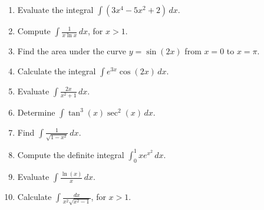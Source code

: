 \documentclass{article}
\begin{document}
    \begin{enumerate}
    \item Evaluate the integral \(\displaystyle \int (3x^4 - 5x^2 + 2) \, dx\).
    \item Compute \(\displaystyle \int \frac{1}{x \ln x} \, dx\), for \(x > 1\).
    \item Find the area under the curve \(y = \sin(2x)\) from \(x=0\) to \(x=\pi\).
    \item Calculate the integral \(\displaystyle \int e^{3x} \cos(2x) \, dx\).
    \item Evaluate \(\displaystyle \int \frac{2x}{x^2 + 1} \, dx\).
    \item Determine \(\displaystyle \int \tan^3(x) \sec^2(x) \, dx\).
    \item Find \(\displaystyle \int \frac{1}{\sqrt{1 - x^2}} \, dx\).
    \item Compute the definite integral \(\displaystyle \int_0^1 x e^{x^2} \, dx\).
    \item Evaluate \(\displaystyle \int \frac{\ln(x)}{x} \, dx\).
    \item Calculate \(\displaystyle \int \frac{dx}{x^2 \sqrt{x^2 - 1}}\), for \(x > 1\).
\end{enumerate}

    
\end{document}
